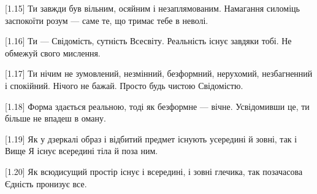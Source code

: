 [1.15] Ти завжди був вільним, осяйним і незаплямованим. Намагання силоміць заспокоїти розум --- саме те, що тримає тебе в неволі.

[1.16] Ти --- Свідомість, сутність Всесвіту. Реальність існує завдяки тобі. Не обмежуй свого мислення.

[1.17] Ти нічим не зумовлений, незмінний, безформний, нерухомий, незбагненний і спокійний. Нічого не бажай. Просто будь чистою Свідомістю.

[1.18] Форма здається реальною, тоді як безформне --- вічне. Усвідомивши це, ти більше не впадеш в оману.

[1.19] Як у дзеркалі образ і відбитий предмет існують усередині й зовні, так і Вище Я існує всередині тіла й поза ним.

[1.20] Як всюдисущий простір існує і всередині, і зовні глечика, так позачасова Єдність пронизує все.
